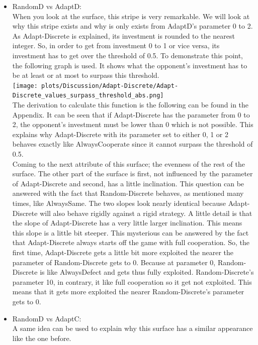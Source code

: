 \documentclass{article}
\begin{document}
\begin{itemize}
	\item RandomD vs AdaptD:\\
		When you look at the surface, this stripe is very remarkable.
		We will look at why this stripe exists and why is only exists from AdaptD's parameter 0 to 2.\\
		As Adapt-Discrete is explained, its investment is rounded to the nearest integer.
		So, in order to get from investment 0 to 1 or vice versa, its investment has to get over the threshold of 0.5.
		To demonstrate this point, the following graph is used.
		It shows what the opponent's investment has to be at least or at most to surpass this threshold.\\
		\texttt{[image: plots/Discussion/Adapt-Discrete/Adapt-Discrete\_values\_surpass\_threshold\_abs.png]}\\
		The derivation to calculate this function is the following can be found in the Appendix.
		It can be seen that if Adapt-Discrete has the parameter from 0 to 2, the opponent's investment must be lower than 0 which is not possible.
		This explains why Adapt-Discrete with its parameter set to either 0, 1 or 2 behaves exactly like AlwaysCooperate since it cannot surpass the threshold of 0.5.\\
		Coming to the next attribute of this surface; the evenness of the rest of the surface.
		The other part of the surface is first, not influenced by the parameter of Adapt-Discrete and second, has a little inclination.
		This question can be answered with the fact that Random-Discrete behaves, as mentioned many times, like AlwaysSame.
		The two slopes look nearly identical because Adapt-Discrete will also behave rigidly against a rigid strategy.
		A little detail is that the slope of Adapt-Discrete has a very little larger inclination.
		This means this slope is a little bit steeper.
		This mysterious can be answered by the fact that Adapt-Discrete always starts off the game with full cooperation.
		So, the first time, Adapt-Discrete gets a little bit more exploited the nearer the parameter of Random-Discrete gets to 0.
		Because at parameter 0, Random-Discrete is like AlwaysDefect and gets thus fully exploited.
		Random-Discrete's parameter 10, in contrary, it like full cooperation so it get not exploited.
		This means that it gets more exploited the nearer Random-Discrete's parameter gets to 0.\\
	\item RandomD vs AdaptC:\\
		A same idea can be used to explain why this surface has a similar appearance like the one before.

\end{itemize}
\end{document}

